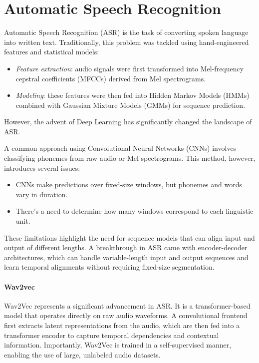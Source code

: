 \section{Automatic Speech Recognition}

Automatic Speech Recognition (ASR) is the task of converting spoken language into written text. 
Traditionally, this problem was tackled using hand-engineered features and statistical models:
\begin{itemize}
    \item \textit{Feature extraction}: audio signals were first transformed into Mel-frequency cepstral coefficients (MFCCs) derived from Mel spectrograms.
    \item \textit{Modeling}: these features were then fed into Hidden Markov Models (HMMs) combined with Gaussian Mixture Models (GMMs) for sequence prediction.
\end{itemize}
\noindent However, the advent of Deep Learning has significantly changed the landscape of ASR.

A common approach using Convolutional Neural Networks (CNNs) involves classifying phonemes from raw audio or Mel spectrograms. This method, however, introduces several issues:
\begin{itemize}
    \item CNNs make predictions over fixed-size windows, but phonemes and words vary in duration.
    \item There's a need to determine how many windows correspond to each linguistic unit.
\end{itemize}
\noindent These limitations highlight the need for sequence models that can align input and output of different lengths.
A breakthrough in ASR came with encoder-decoder architectures, which can handle variable-length input and output sequences and learn temporal alignments without requiring fixed-size segmentation.

\paragraph*{Wav2vec}
Wav2Vec represents a significant advancement in ASR. 
It is a transformer-based model that operates directly on raw audio waveforms.
A convolutional frontend first extracts latent representations from the audio, which are then fed into a transformer encoder to capture temporal dependencies and contextual information. 
Importantly, Wav2Vec is trained in a self-supervised manner, enabling the use of large, unlabeled audio datasets.

